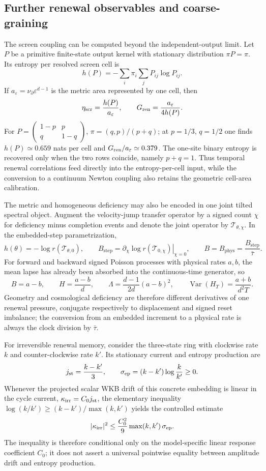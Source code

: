 \documentclass[11pt]{article}
\theoremstyle{definition}
\theoremstyle{remark}
\newcommand{\eps}{\varepsilon}
\newcommand{\Bstep}{B_{\mathrm{step}}}
\newcommand{\Bphys}{B_{\mathrm{phys}}}
\newcommand{\bartau}{\bar\tau}
\newcommand{\Npartial}{\nu_{\partial}}
\begin{document}
\subsection{Further renewal observables and coarse-graining}
\label{subsec:renewal-native-observables}

The screen coupling can be computed beyond the independent-output limit.  Let
\(P\) be a primitive finite-state output kernel with stationary distribution
\(\pi P=\pi\).  Its entropy per resolved screen cell is
\[
 h(P)=-\sum_i\pi_i\sum_jP_{ij}\log P_{ij}.
\]
If \(a_\eps=\Npartial\eps^{d-1}\) is the metric area represented by one cell,
then
\[
 \eta_{\rm scr}=\frac{h(P)}{a_\eps},
 \qquad
 G_{\rm ren}=\frac{a_\eps}{4h(P)}.
\]
For
\(P=\left(\begin{smallmatrix}1-p&p\\q&1-q\end{smallmatrix}\right)\),
\(\pi=(q,p)/(p+q)\); at \(p=1/3\), \(q=1/2\) one finds
\(h(P)\simeq0.659\) nats per cell and
\(G_{\rm ren}/a_\eps\simeq0.379\).  The one-site binary entropy is recovered
only when the two rows coincide, namely \(p+q=1\).  Thus temporal renewal
correlations feed directly into the entropy-per-cell input, while the conversion
to a continuum Newton coupling also retains the geometric cell-area calibration.

The metric and homogeneous deficiency may also be encoded in one joint tilted
spectral object.  Augment the velocity-jump transfer operator by a signed count
\(\chi\) for deficiency minus completion events and denote the joint operator by
\(\mathcal T_{\theta,\chi}\).  In the embedded-step parametrization,
\[
 h(\theta)=-\log r(\mathcal T_{\theta,0}),
 \qquad
 \Bstep=\left.\partial_\chi\log r(\mathcal T_{0,\chi})\right|_{\chi=0},
 \qquad
 B=\Bphys=\frac{\Bstep}{\bartau}.
\]
For forward and backward signed Poisson processes with physical rates \(a,b\),
the mean lapse has already been absorbed into the continuous-time generator, so
\[
 B=a-b,\qquad H=\frac{a-b}{d},\qquad
 \Lambda=\frac{d-1}{2d}(a-b)^2,
 \qquad \operatorname{Var}(H_T)=\frac{a+b}{d^2T}.
\]
Geometry and cosmological deficiency are therefore different derivatives of one
renewal pressure, conjugate respectively to displacement and signed reset
imbalance; the conversion from an embedded increment to a physical rate is
always the clock division by \(\bartau\).

For irreversible renewal memory, consider the three-state ring with clockwise
rate $k$ and counter-clockwise rate $k'$.  Its stationary current and entropy
production are
\[
 j_{\rm st}=\frac{k-k'}{3},\qquad
 \sigma_{\rm ep}=(k-k')\log\frac{k}{k'}\ge0.
\]
Whenever the projected scalar WKB drift of this concrete embedding is linear in
the cycle current, $\kappa_{\rm irr}=C_0j_{\rm st}$, the elementary inequality
$\log(k/k')\ge(k-k')/\max(k,k')$ yields the controlled estimate
\[
 |\kappa_{\rm irr}|^2\le
 \frac{C_0^2}{9}\max(k,k')\,\sigma_{\rm ep}.
\]
The inequality is therefore conditional only on the model-specific linear
response coefficient $C_0$; it does not assert a universal pointwise equality
between amplitude drift and entropy production.
\end{document}
